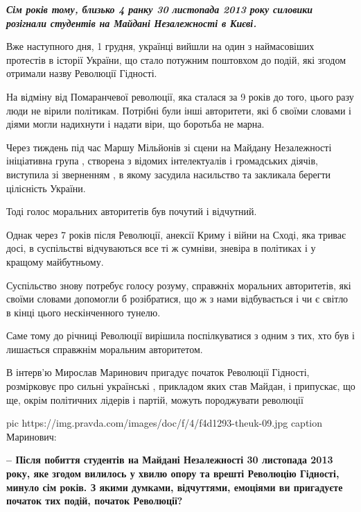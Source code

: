 \begin{leftbar}
	\bfseries\em
Сім років тому, близько 4 ранку 30 листопада 2013 року силовики розігнали
студентів на Майдані Незалежності в Києві.

Вже наступного дня, 1 грудня, українці вийшли на один з наймасовіших протестів
в історії України, що стало потужним поштовхом до подій, які згодом отримали
назву Революції Гідності.

На відміну від Помаранчевої революції, яка сталася за 9 років до того, цього
разу люди не вірили політикам. Потрібні були інші авторитети, які б своїми
словами і діями могли надихнути і надати віри, що боротьба не марна.

Через тиждень під час Маршу Мільйонів зі сцени на Майдану Незалежності
ініціативна група , створена з відомих інтелектуалів і
громадських діячів, виступила зі зверненням , в
якому засудила насильство та закликала берегти цілісність України.

Тоді голос моральних авторитетів був почутий і відчутний.

Однак через 7 років після Революції, анексії Криму і війни на Сході, яка триває
досі, в суспільстві відчуваються все ті ж сумніви, зневіра в політиках і у
кращому майбутньому.

Суспільство знову потребує голосу розуму, справжніх моральних авторитетів, які
своїми словами допомогли б розібратися, що ж з нами відбувається і чи є світло
в кінці цього нескінченного тунелю.  

Саме тому  до річниці Революції вирішила поспілкуватися з
одним з тих, хто був і лишається справжнім моральним авторитетом. 

В інтерв’ю  Мирослав Маринович пригадує 
початок Революції Гідності, розмірковує про сильні українські ,
прикладом яких став Майдан, і припускає, що ще, окрім політичних лідерів і
партій, можуть породжувати революції
\end{leftbar}

\ifcmt
pic https://img.pravda.com/images/doc/f/4/f4d1293-theuk-09.jpg
caption Маринович: 
\fi

\textbf{– Після побиття студентів на Майдані Незалежності 30 листопада 2013 року, яке
згодом вилилось у хвилю опору та врешті Революцію Гідності, минуло сім років. З
якими думками, відчуттями, емоціями ви пригадуєте початок тих подій, початок
Революції?}

